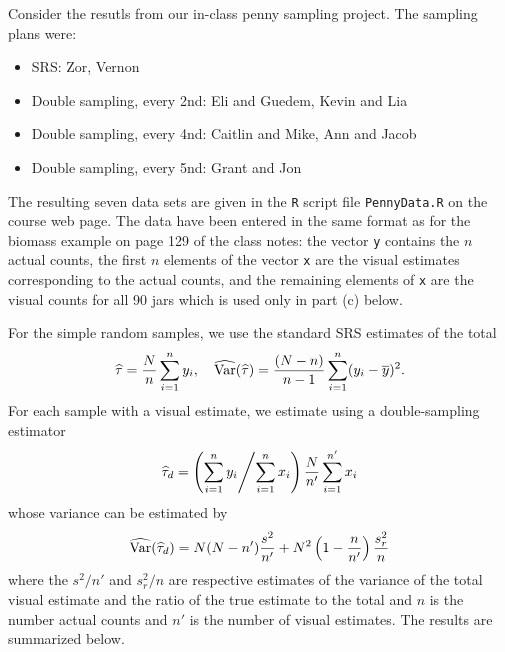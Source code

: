 \documentclass[usenames,dvipsnames]{homework}
\begin{document}
\begin{longproblem} Consider the resutls from our in-class penny sampling project.  The sampling plans were:
  \begin{itemize}
    \item SRS: Zor, Vernon
    \item Double sampling, every 2nd: Eli and Guedem, Kevin and Lia
    \item Double sampling, every 4nd: Caitlin and Mike, Ann and Jacob
    \item Double sampling, every 5nd: Grant and Jon
  \end{itemize}

  The resulting seven data sets are given in the \texttt{R} script file \texttt{PennyData.R} on the course web page.  The data have been entered in the same format as for the biomass example on page 129 of the class notes:  the vector \texttt{y} contains the $n$ actual counts, the first $n$ elements of the vector \texttt{x} are the visual estimates corresponding to the actual counts, and the remaining elements of \texttt{x} are the visual counts for all 90 jars which is used only in part (c) below.


\begin{solution}
For the simple random samples, we use the standard SRS estimates of the total
$$
\hat\tau = \frac Nn \sum_{i=1}^n y_i,\quad \hat{\Var}(\hat\tau) = \frac{(N-n)}{n-1}\sum_{i=1}^n (y_i - \bar y)^2.
$$
For each sample with a visual estimate, we estimate using a double-sampling estimator 
$$
\hat\tau_d = \left( \sum_{i=1}^n y_i \middle/ \sum_{i=1}^n x_i \right) \frac N{n'} \sum_{i=1}^{n'}x_i
$$
whose variance can be estimated by
$$
\hat{\Var}(\hat\tau_d)  = N(N-n')\frac {s^2}{n'} + N^2\left(1-\frac n{n'}\right) \frac{s_r^2}{n}
$$
where the $s^2/n'$ and $s_r^2/n$ are respective estimates of the variance of the total visual estimate and the ratio of the true estimate to the total and $n$ is the number actual counts and $n'$ is the number of visual estimates. The results are summarized below.


\end{solution}
\end{longproblem}
\end{document}

